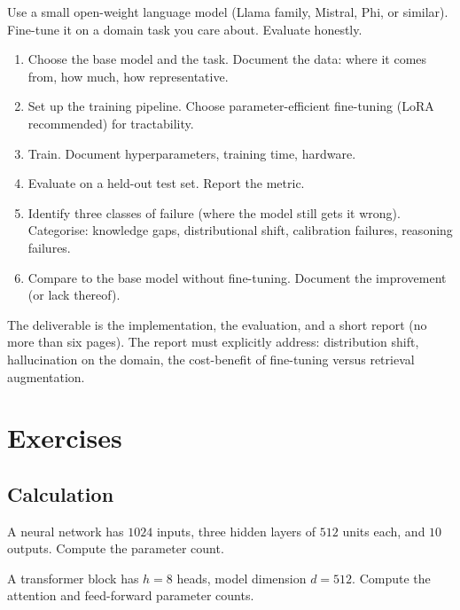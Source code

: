 \begin{project}
Use a small open-weight language model (Llama family, Mistral, Phi, or similar). Fine-tune it on a domain task you care about. Evaluate honestly.

\begin{enumerate}[leftmargin=*]
  \item Choose the base model and the task. Document the data: where it comes from, how much, how representative.
  \item Set up the training pipeline. Choose parameter-efficient fine-tuning (LoRA recommended) for tractability.
  \item Train. Document hyperparameters, training time, hardware.
  \item Evaluate on a held-out test set. Report the metric.
  \item Identify three classes of failure (where the model still gets it wrong). Categorise: knowledge gaps, distributional shift, calibration failures, reasoning failures.
  \item Compare to the base model without fine-tuning. Document the improvement (or lack thereof).
\end{enumerate}

The deliverable is the implementation, the evaluation, and a short report (no more than six pages). The report must explicitly address: distribution shift, hallucination on the domain, the cost-benefit of fine-tuning versus retrieval augmentation.
\end{project}

\section{Exercises}

\subsection*{Calculation}

\begin{exercise}
A neural network has $1024$ inputs, three hidden layers of $512$ units each, and $10$ outputs. Compute the parameter count.
\end{exercise}

\begin{exercise}
A transformer block has $h = 8$ heads, model dimension $d = 512$. Compute the attention and feed-forward parameter counts.
\end{exercise}

